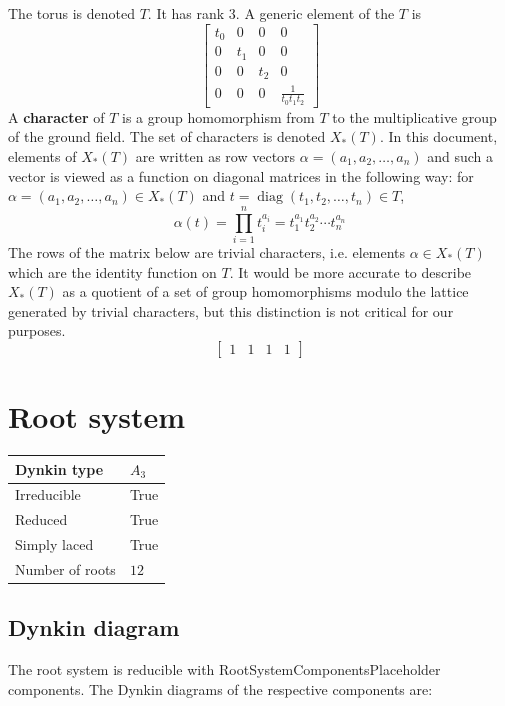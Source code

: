 \documentclass[11pt]{article}
\newcommand{\tbf}{\textbf}
\DeclareMathOperator{\diag}{diag}
\theoremstyle{definition}
\newif\ifrootsystemirreducible
\begin{document}
The torus is denoted $T$. It has rank $3$. A generic element of the $T$ is
\[
\left[\begin{matrix}t_{0} & 0 & 0 & 0\\0 & t_{1} & 0 & 0\\0 & 0 & t_{2} & 0\\0 & 0 & 0 & \frac{1}{t_{0} t_{1} t_{2}}\end{matrix}\right]
\]
A \tbf{character} of $T$ is a group homomorphism from $T$ to the multiplicative group of the ground field. The set of characters is denoted $X_*(T)$. In this document, elements of $X_*(T)$ are written as row vectors $\alpha = (a_1, a_2, \ldots, a_n)$ and such a vector is viewed as a function on diagonal matrices in the following way: for $\alpha = (a_1, a_2, \ldots, a_n) \in X_*(T)$ and $t = \diag(t_1, t_2, \ldots, t_n) \in T$, 
\[
	\alpha(t) = \prod_{i=1}^n t_i^{a_i} = t_1^{a_1} t_2^{a_2} \cdots t_n^{a_n}
\]
The rows of the matrix below are trivial characters, i.e. elements $\alpha \in X_*(T)$ which are the identity function on $T$. It would be more accurate to describe $X_*(T)$ as a quotient of a set of group homomorphisms modulo the lattice generated by trivial characters, but this distinction is not critical for our purposes.
\[
\left[\begin{matrix}1 & 1 & 1 & 1\end{matrix}\right]
\]

\newpage
\section{Root system}

\begin{tabular}{|l|l|}
	\hline
    Dynkin type & $A_3$ \\
	\hline
    Irreducible & True \\
	\hline
    Reduced & True \\
	\hline
	Simply laced & True \\
	\hline
	Number of roots & $12$ \\
	\hline
\end{tabular}

\subsection{Dynkin diagram}

\ifrootsystemirreducible
The root system is irreducible and has Dynkin diagram:
\else
The root system is reducible with RootSystemComponentsPlaceholder components. The Dynkin diagrams of the respective components are:
\fi
\end{document}
